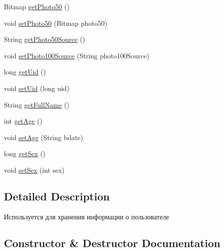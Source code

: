 \begin{DoxyCompactItemize}
\item 
Bitmap \hyperlink{classcom_1_1qto_1_1ru_1_1vkmessanger_1_1vk_1_1_vk_user_ad276204cec768b3bcd32c7cfff5725b0}{get\+Photo50} ()
\item 
void \hyperlink{classcom_1_1qto_1_1ru_1_1vkmessanger_1_1vk_1_1_vk_user_a19d0aad1747e4bcbd74c942e10af5bc9}{set\+Photo50} (Bitmap photo50)
\item 
String \hyperlink{classcom_1_1qto_1_1ru_1_1vkmessanger_1_1vk_1_1_vk_user_aca48b51d0576f01f21dac68ae7392701}{get\+Photo50\+Source} ()
\item 
void \hyperlink{classcom_1_1qto_1_1ru_1_1vkmessanger_1_1vk_1_1_vk_user_a858e40552d884442762db5ca6a9c2b06}{set\+Photo100\+Source} (String photo100\+Source)
\item 
long \hyperlink{classcom_1_1qto_1_1ru_1_1vkmessanger_1_1vk_1_1_vk_user_a2b3784e8694d127c652658901dc09335}{get\+Uid} ()
\item 
void \hyperlink{classcom_1_1qto_1_1ru_1_1vkmessanger_1_1vk_1_1_vk_user_a7d8de4b8e9ba389a48000e8f2ea6ce80}{set\+Uid} (long uid)
\item 
String \hyperlink{classcom_1_1qto_1_1ru_1_1vkmessanger_1_1vk_1_1_vk_user_a9ca33d3a2bdc6f671e5068ff6f4ea631}{get\+Full\+Name} ()
\item 
int \hyperlink{classcom_1_1qto_1_1ru_1_1vkmessanger_1_1vk_1_1_vk_user_ae5a7286bc332e2cb1c4382cf52f29a67}{get\+Age} ()
\item 
void \hyperlink{classcom_1_1qto_1_1ru_1_1vkmessanger_1_1vk_1_1_vk_user_a4c9cd8a8341f9d16969a204c218e7c0e}{set\+Age} (String bdate)
\item 
long \hyperlink{classcom_1_1qto_1_1ru_1_1vkmessanger_1_1vk_1_1_vk_user_a7648978c552a7134123a8a4ce4e36e71}{get\+Sex} ()
\item 
void \hyperlink{classcom_1_1qto_1_1ru_1_1vkmessanger_1_1vk_1_1_vk_user_ae4994cdcc36ff0596ee59f2f940376cb}{set\+Sex} (int sex)
\end{DoxyCompactItemize}


\subsection{Detailed Description}
Используется для хранения информации о пользователе 

\subsection{Constructor \& Destructor Documentation}
\hypertarget{classcom_1_1qto_1_1ru_1_1vkmessanger_1_1vk_1_1_vk_user_a318664d43f1990779574e4096d011164}{}
